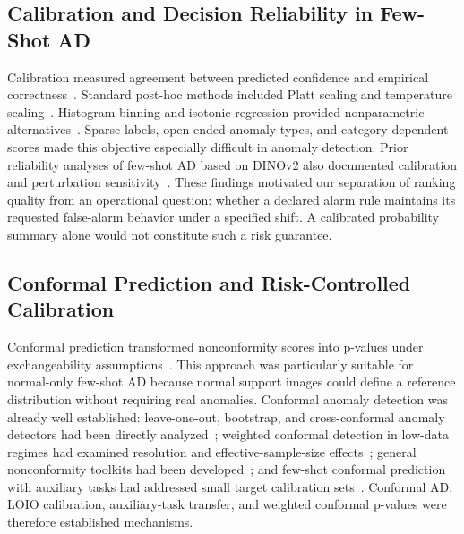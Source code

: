 \subsection{Calibration and Decision Reliability in Few-Shot AD}
Calibration measured agreement between predicted confidence and empirical correctness~\cite{platt1999,guo2017calibration}. Standard post-hoc methods included Platt scaling and temperature scaling~\cite{platt1999,guo2017calibration}. Histogram binning and isotonic regression provided nonparametric alternatives~\cite{zadrozny2001obtaining,zadrozny2002transforming}. Sparse labels, open-ended anomaly types, and category-dependent scores made this objective especially difficult in anomaly detection. Prior reliability analyses of few-shot AD based on DINOv2 also documented calibration and perturbation sensitivity~\cite{khan2025calibration}. These findings motivated our separation of ranking quality from an operational question: whether a declared alarm rule maintains its requested false-alarm behavior under a specified shift. A calibrated probability summary alone would not constitute such a risk guarantee.

\subsection{Conformal Prediction and Risk-Controlled Calibration}
Conformal prediction transformed nonconformity scores into p-values under exchangeability assumptions~\cite{vovk2005,shafer2008tutorial,angelopoulos2021gentle}. This approach was particularly suitable for normal-only few-shot AD because normal support images could define a reference distribution without requiring real anomalies. Conformal anomaly detection was already well established: leave-one-out, bootstrap, and cross-conformal anomaly detectors had been directly analyzed~\cite{hennhofer2024loio}; weighted conformal detection in low-data regimes had examined resolution and effective-sample-size effects~\cite{hennhofer2026weighted}; general nonconformity toolkits had been developed~\cite{hennhofer2026nonconform}; and few-shot conformal prediction with auxiliary tasks had addressed small target calibration sets~\cite{fisch2021fewshot}. Conformal AD, LOIO calibration, auxiliary-task transfer, and weighted conformal p-values were therefore established mechanisms.


